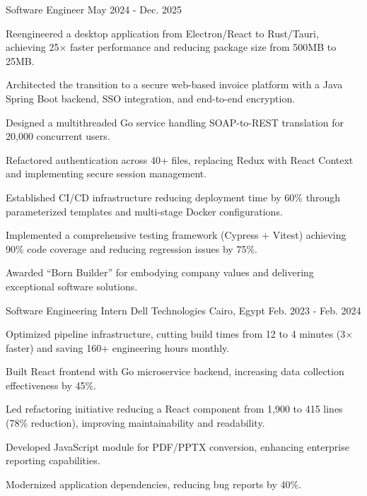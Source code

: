 \begin{cventries}
  \cventry
    {Software Engineer} %
    {} %
    {} %
    {May 2024 - Dec. 2025} %
    {
      \begin{cvitems} %
        \item {Reengineered a desktop application from Electron/React to Rust/Tauri, achieving 25$\times$ faster performance and reducing package size from 500MB to 25MB.}
        \item {Architected the transition to a secure web-based invoice platform with a Java Spring Boot backend, SSO integration, and end-to-end encryption.}
        \item {Designed a multithreaded Go service handling SOAP-to-REST translation for 20,000 concurrent users.}
        \item {Refactored authentication across 40+ files, replacing Redux with React Context and implementing secure session management.}
        \item {Established CI/CD infrastructure reducing deployment time by 60\% through parameterized templates and multi-stage Docker configurations.}
        \item {Implemented a comprehensive testing framework (Cypress + Vitest) achieving 90\% code coverage and reducing regression issues by 75\%.}
        \item {Awarded ``Born Builder'' for embodying company values and delivering exceptional software solutions.}
      \end{cvitems}
    }

  \cventry
    {Software Engineering Intern} %
    {Dell Technologies} %
    {Cairo, Egypt} %
    {Feb. 2023 - Feb. 2024} %
    {
      \begin{cvitems} %
        \item {Optimized pipeline infrastructure, cutting build times from 12 to 4 minutes (3$\times$ faster) and saving 160+ engineering hours monthly.}
        \item {Built React frontend with Go microservice backend, increasing data collection effectiveness by 45\%.}
        \item {Led refactoring initiative reducing a React component from 1,900 to 415 lines (78\% reduction), improving maintainability and readability.}
        \item {Developed JavaScript module for PDF/PPTX conversion, enhancing enterprise reporting capabilities.}
        \item {Modernized application dependencies, reducing bug reports by 40\%.}
      \end{cvitems}
    }


\end{cventries}
